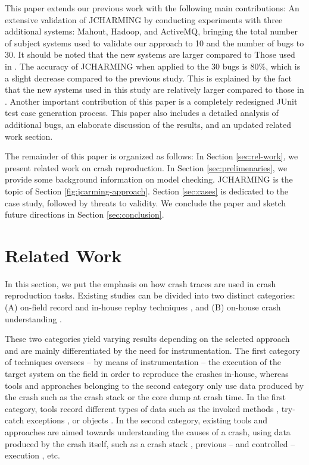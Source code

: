 \documentclass[times, doublespace]{smrauth}
\begin{document}
This paper extends our previous work \cite{Nayrolles2015} with the following main contributions:
An extensive validation of JCHARMING by conducting experiments with three
additional systems: Mahout, Hadoop, and ActiveMQ,
bringing the total number of subject systems used to
validate our approach to 10 and the number of bugs to 30.
It should be noted that the new systems are larger compared to
Those used in \cite{Nayrolles2015}.
The accuracy of JCHARMING when applied to the 30 bugs is 80\%,
which is a slight decrease compared to the previous study.
This is explained by the fact that the new systems used in
this study are relatively larger compared to those in \cite{Nayrolles2015}.
Another important contribution of this paper is a completely redesigned
JUnit test case generation process.
This paper also includes a detailed
analysis of additional bugs, an elaborate discussion of the
results, and an updated related work section.

The remainder of this paper is organized as follows: In Section
\ref{sec:rel-work}, we present related work on crash reproduction. In Section \ref{sec:prelimenaries}, we provide some background information on model
checking. JCHARMING is the topic of Section \ref{fig:jcarming-approach}. Section \ref{sec:cases}
is dedicated to the case study, followed by threats to validity.
We conclude the paper and sketch future directions in Section
\ref{sec:conclusion}.


\section{Related Work\label{sec:rel-work}}

In this section, we put the emphasis on how crash traces are used in crash reproduction tasks.
Existing studies can be divided into two distinct categories: (A) on-field record and in-house replay techniques \cite{Steven2000,Narayanasamy2005,Artzi2008,Roehm2015}, and (B) on-house crash understanding \cite{Jin2012,Jin2013,Zuddas2014,Chen2013a,Nayrolles2015}.

These two categories yield varying results depending on the selected approach and are mainly differentiated by the need for instrumentation.
The first category of techniques oversees -- by means of instrumentation -- the execution of the target system on the field in order to reproduce the crashes in-house, whereas tools and approaches belonging to the second category only use data produced by the crash such as the crash stack or the core dump at crash time. In the first category, tools record different types of data such as the invoked methods \cite{Narayanasamy2005}, try-catch exceptions \cite{Rossler2013}, or objects \cite{Jaygarl}. In the second category, existing tools and approaches are aimed towards understanding the causes of a crash, using data produced by the crash itself, such as a crash stack \cite{Chen2013a}, previous -- and controlled -- execution \cite{Zuddas2014}, etc.
\end{document}
